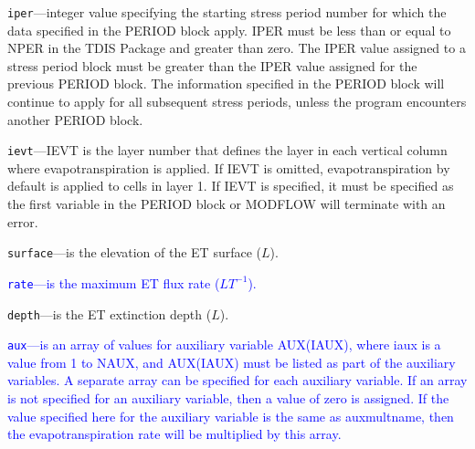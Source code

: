 \begin{description}
\item \texttt{iper}---integer value specifying the starting stress period number for which the data specified in the PERIOD block apply.  IPER must be less than or equal to NPER in the TDIS Package and greater than zero.  The IPER value assigned to a stress period block must be greater than the IPER value assigned for the previous PERIOD block.  The information specified in the PERIOD block will continue to apply for all subsequent stress periods, unless the program encounters another PERIOD block.

\item \texttt{ievt}---IEVT is the layer number that defines the layer in each vertical column where evapotranspiration is applied. If IEVT is omitted, evapotranspiration by default is applied to cells in layer 1.  If IEVT is specified, it must be specified as the first variable in the PERIOD block or MODFLOW will terminate with an error.

\item \texttt{surface}---is the elevation of the ET surface ($L$).

\item \textcolor{blue}{\texttt{rate}---is the maximum ET flux rate ($LT^{-1}$).}

\item \texttt{depth}---is the ET extinction depth ($L$).

\item \textcolor{blue}{\texttt{aux}---is an array of values for auxiliary variable AUX(IAUX), where iaux is a value from 1 to NAUX, and AUX(IAUX) must be listed as part of the auxiliary variables.  A separate array can be specified for each auxiliary variable.  If an array is not specified for an auxiliary variable, then a value of zero is assigned.  If the value specified here for the auxiliary variable is the same as auxmultname, then the evapotranspiration rate will be multiplied by this array.}

\end{description}

